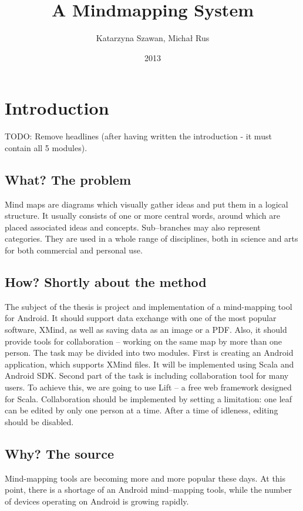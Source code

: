 \documentclass[american]{bsc}
\title{A Mindmapping System}
\author{Katarzyna Szawan, Michał Rus}
\date{2013}
\begin{document}
\maketitle

\chapter{Introduction}
\label{chap:introduction}
TODO: Remove headlines (after having written the introduction - it must contain all 5 modules). 
\section{What? The problem}
\label{sec:what}
Mind maps are diagrams which visually gather ideas and put them in a logical structure. It usually consists of one or more central words, around which are placed associated ideas and concepts. Sub--branches may also represent categories.  They are used in a whole range of disciplines, both in science and arts for both commercial and personal use. 

\section{How? Shortly about the method}
\label{sec:how}
The subject of the thesis is project and implementation of a mind-mapping tool for Android. It should support data exchange with one of the most popular software, XMind, as well as saving data as an image or a PDF. Also, it should provide tools for collaboration -- working on the same map by more than one person. The task may be divided into two modules. First is creating an Android application, which supports XMind files. It will be implemented using Scala and Android SDK. Second part of the task is including collaboration tool for many users. To achieve this, we are going to use Lift -- a free web framework  designed for Scala. Collaboration should be implemented by setting a limitation: one leaf can be edited by only one person at a time. After a time of idleness, editing should be disabled.

\section{Why? The source}
\label{sec:why}
Mind-mapping tools are becoming more and more popular these days. At this point, there is a shortage of an Android mind--mapping tools, while the number of devices operating on Android is growing rapidly. 
\end{document}
